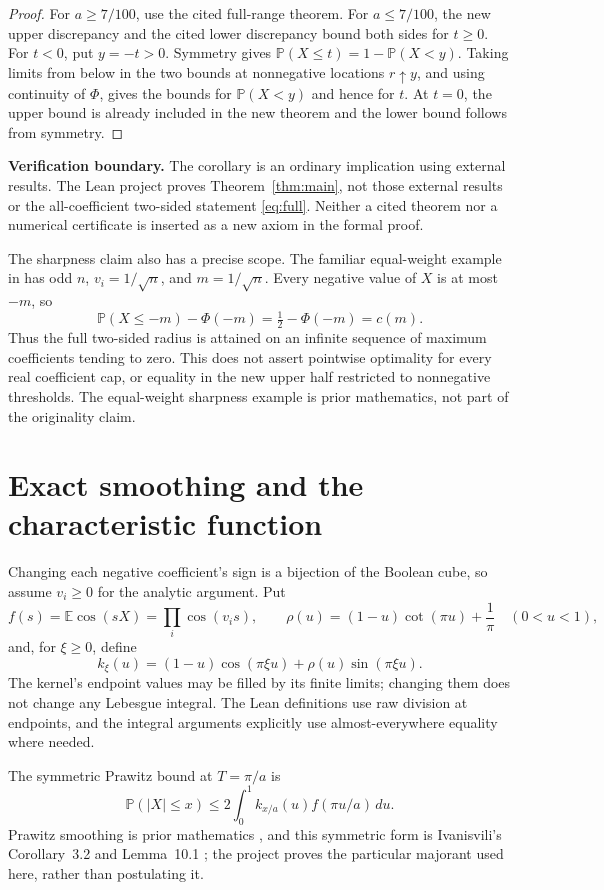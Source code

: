 \documentclass[11pt]{article}
\newcommand{\Pp}{\mathbb P}
\newcommand{\E}{\mathbb E}
\begin{document}
\begin{proof}
For $a\ge7/100$, use the cited full-range theorem. For $a\le7/100$, the new
upper discrepancy and the cited lower discrepancy bound both sides for
$t\ge0$. For $t<0$, put $y=-t>0$. Symmetry gives
$\Pp(X\le t)=1-\Pp(X<y)$. Taking limits from below in the two bounds at
nonnegative locations $r\uparrow y$, and using continuity of $\Phi$, gives
the bounds for $\Pp(X<y)$ and hence for $t$. At $t=0$, the upper bound is
already included in the new theorem and the lower bound follows from symmetry.
\end{proof}

\textbf{Verification boundary.} The corollary is an ordinary implication
using external results. The Lean project proves Theorem~\ref{thm:main},
not those external results or the all-coefficient two-sided statement
\eqref{eq:full}. Neither a cited theorem nor a numerical certificate is inserted
as a new axiom in the formal proof.

The sharpness claim also has a precise scope. The familiar equal-weight
example in \cite{KK} has odd $n$, $v_i=1/\sqrt n$, and $m=1/\sqrt n$.
Every negative value of $X$ is at most $-m$, so
\[
 \Pp(X\le-m)-\Phi(-m)=\tfrac12-\Phi(-m)=c(m).
\]
Thus the full two-sided radius is attained on an infinite sequence of
maximum coefficients tending to zero. This does not assert pointwise
optimality for every real coefficient cap, or equality in the new upper
half restricted to nonnegative thresholds. The equal-weight sharpness
example is prior mathematics, not part of the originality claim.

\section{Exact smoothing and the characteristic function}

Changing each negative coefficient's sign is a bijection of the Boolean cube,
so assume $v_i\ge0$ for the analytic argument. Put
\[
 f(s)=\E\cos(sX)=\prod_i\cos(v_i s),\qquad
 \rho(u)=(1-u)\cot(\pi u)+\frac1\pi\quad(0<u<1),
\]
and, for $\xi\ge0$, define
\[
 k_\xi(u)=(1-u)\cos(\pi\xi u)+\rho(u)\sin(\pi\xi u).
\]
The kernel's endpoint values may be filled by its finite limits; changing
them does not change any Lebesgue integral. The Lean definitions use raw division at endpoints, and
the integral arguments explicitly use almost-everywhere equality where needed.

The symmetric Prawitz bound at $T=\pi/a$ is
\begin{equation}\label{eq:prawitz}
 \Pp(|X|\le x)\le 2\int_0^1 k_{x/a}(u)f(\pi u/a)\,du.
\end{equation}
Prawitz smoothing is prior mathematics \cite{P}, and this symmetric form is
Ivanisvili's Corollary~3.2 and Lemma~10.1 \cite{I}; the project proves the
particular majorant used here, rather than postulating it.
\end{document}
